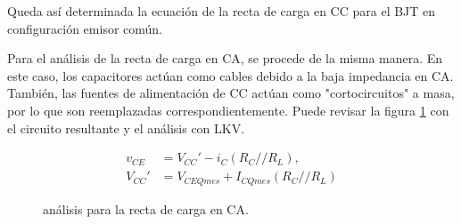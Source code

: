     Queda así determinada la ecuación de la recta de carga en CC para el BJT en configuración emisor común.

    Para el análisis de la recta de carga en CA, se procede de la misma manera. En este caso, los capacitores actúan
    como cables debido a la baja impedancia en CA. También, las fuentes de alimentación de CC actúan como
    "cortocircuitos" a masa, por lo que son reemplazadas correspondientemente. Puede revisar la figura \ref{fig:recta_ca}
    con el circuito resultante y el análisis con LKV.
    \begin{figure}[H]
      \centering
      \begin{minipage}{0.49\textwidth}
      \end{minipage}
      \begin{minipage}{0.49\textwidth}
        \begin{align*}
          v_{CE} &= V_{CC}' - i_C (R_C//R_L),\\[6pt]
          V_{CC}' &= V_{CEQ mes} + I_{CQ mes} (R_C//R_L)
        \end{align*}
      \end{minipage}
      \caption{análisis para la recta de carga en CA.}
      \label{fig:recta_ca}
    \end{figure}


